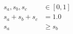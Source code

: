 \begin{align}
  s_a, s_b, s_c &\in [0, 1] \\
  s_a + s_b + s_c &= 1.0 \\
  s_a &\ge s_b
\end{align}
